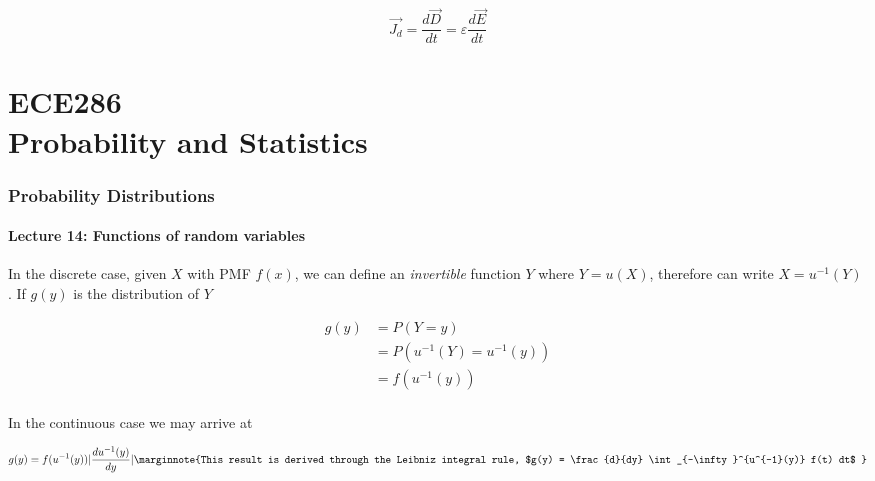 \documentclass[10pt]{article}
\begin{document}
\begin{equation}
	\vec{J_d} = \frac{d \vec{D}}{dt}  = \varepsilon \frac{d \vec{E}}{dt}
\end{equation}






































\newpage
\part{ECE286\texorpdfstring{\\}.Probability and Statistics}

\section{Probability Distributions}
\subsection{Lecture 14: Functions of random variables}

In the discrete case, given $ X $ with PMF $ f(x) $, we can define an \textit{invertible} function $ Y $ where $ Y = u(X) $, therefore can write $ X = u^{-1} (Y)$ . 
If $ g(y) $  is the distribution of $ Y $


\begin{equation}
	\begin{split}
		g(y) &= P(Y = y) \\
				 &= P(u^{-1}(Y) = u^{-1}(y))\\
				 &= f(u^{-1}(y)) \\
	\end{split}
	\label{eq:286:discrete_random_var_fn}
\end{equation}

In the continuous case we may arrive at 

\begin{equation}
	g(y) = f(u^{-1}(y)) | \frac{du^{-1}(y)}{dy} |
	\label{eq:286:cont_random_var_fn}
	\marginnote{This result is derived through the Leibniz integral rule, $g(y) = \frac{d}{dy} \int_{-\infty}^{u^{-1}(y)}  f(t) dt$ }
\end{equation}
\end{document}
